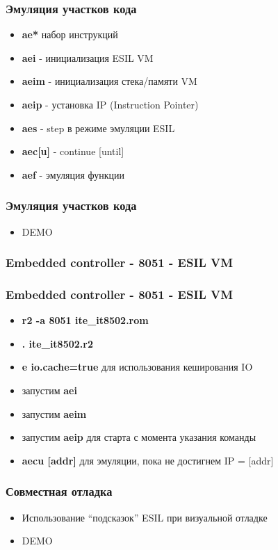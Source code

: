 \documentclass[10pt,pdf,utf8,english,compress,hyperref={unicode}]{beamer}
\begin{document}
\begin{frame}[fragile]
  \frametitle{Эмуляция участков кода}
     \begin{itemize}
        \item \alert{\bf{ae*}} набор инструкций
		\item \alert{\bf{aei}} - инициализация ESIL VM
		\item \alert{\bf{aeim}} - инициализация стека/памяти VM
		\item \alert{\bf{aeip}} - установка IP (Instruction Pointer)
		\item \alert{\bf{aes}} - step в режиме эмуляции ESIL
		\item \alert{\bf{aec[u]}} - continue [until]
		\item \alert{\bf{aef}} - эмуляция функции
      \end{itemize}
\end{frame}

\begin{frame}[fragile]
  \frametitle{Эмуляция участков кода}
     \begin{itemize}
        \item DEMO
      \end{itemize}
\end{frame}

\begin{frame}[fragile]
\ifxetex
  \frametitle{Embedded controller - 8051 - ESIL VM}
\else
  \frametitle{Embedded controller - 8051 - ESIL VM }
\fi
  \begin{itemize}
	  \item \alert{\bf{r2 -a 8051 ite\_it8502.rom}}
	  \item \alert{\bf{. ite\_it8502.r2}}
	  \item \alert{\bf{e io.cache=true}} для использования кеширования IO
	  \item запустим \alert{\bf{aei}}
	  \item запустим \alert{\bf{aeim}}
	  \item запустим \alert{\bf{aeip}} для старта с момента указания команды
	  \item \alert{\bf{aecu [addr]}} для эмуляции, пока не достигнем IP = [addr]
  \end{itemize}
\end{frame}

\begin{frame}[fragile]
  \frametitle{Совместная отладка}
     \begin{itemize}
		\item Использование ``подсказок'' ESIL при визуальной отладке
        \item DEMO
      \end{itemize}
\end{frame}
\end{document}
